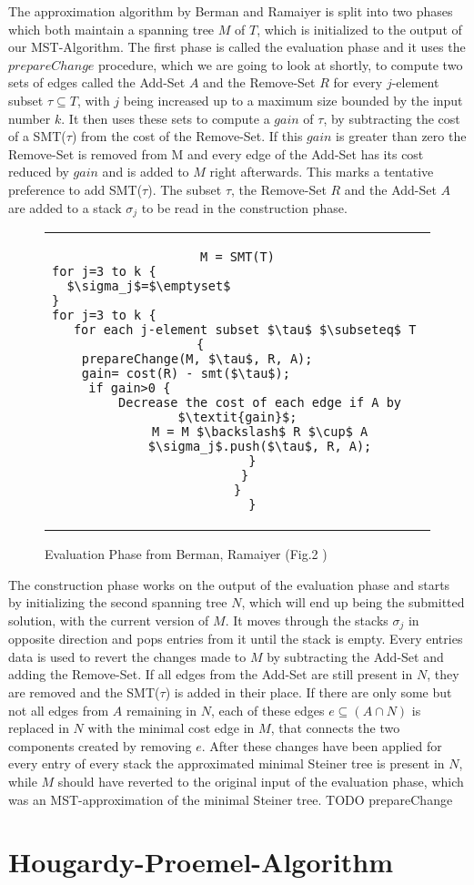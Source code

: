 The approximation algorithm by Berman and Ramaiyer is split into two phases which both maintain a spanning tree $M$ of $T$, which is initialized to the output of our MST-Algorithm. The first phase is called the evaluation phase and it uses the $prepareChange$ procedure, which we are going to look at shortly, to compute two sets of edges called the Add-Set $A$ and the Remove-Set $R$ for every $j$-element subset $\tau \subseteq T$, with $j$ being increased up to a maximum size bounded by the input number $k$. It then uses these sets to compute a $gain$ of $\tau$, by subtracting the cost of a SMT($\tau$) from the cost of the Remove-Set. If this $gain$ is greater than zero the Remove-Set is removed from M and every edge of the Add-Set has its cost reduced by $gain$ and is added to $M$ right afterwards. This marks a tentative preference to add SMT($\tau$). The subset $\tau$, the Remove-Set $R$ and the Add-Set $A$ are added to a stack $\sigma_j$ to be read in the construction phase.
\begin{figure}[htbp]
  \centering
  \begin{tabular}{c}
  \begin{lstlisting}[mathescape]
M = SMT(T)
for j=3 to k {											
  $\sigma_j$=$\emptyset$								
}													
for j=3 to k {											
  for each j-element subset $\tau$ $\subseteq$ T {			
    prepareChange(M, $\tau$, R, A);						
    gain= cost(R) - smt($\tau$);					
    if gain>0 {									
      Decrease the cost of each edge if A by $\textit{gain}$;
      M = M $\backslash$ R $\cup$ A
      $\sigma_j$.push($\tau$, R, A);
    }
  }
}
    }
  \end{lstlisting}
  \end{tabular}
  \caption[evaluation]{Evaluation Phase from Berman, Ramaiyer (Fig.2 \cite{BeRa94})}\label{fig:evaPseudo}
\end{figure}

The construction phase works on the output of the evaluation phase and starts by initializing the second spanning tree $N$, which will end up being the submitted solution, with the current version of $M$. It moves through the stacks $\sigma_j$ in opposite direction and pops entries from it until the stack is empty. Every entries data is used to revert the changes made to $M$ by subtracting the Add-Set and adding the Remove-Set. If all edges from the Add-Set are still present in $N$, they are removed and the SMT($\tau$) is added in their place. If there are only some but not all edges from $A$ remaining in $N$, each of these edges $e \subseteq (A\cap N)$ is replaced in $N$ with the minimal cost edge in $M$, that connects the two components created by removing $e$. After these changes have been applied for every entry of every stack the approximated minimal Steiner tree is present in $N$, while $M$ should have reverted to the original input of the evaluation phase, which was an MST-approximation of the minimal Steiner tree. 
TODO prepareChange
\section{Hougardy-Proemel-Algorithm}


